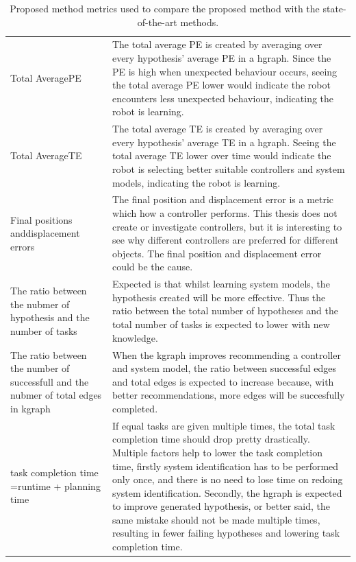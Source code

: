 \noindent
\begin{table}[H]
\centering
\begin{tabular}%
  {>{\raggedright\arraybackslash}p{}%
   >{\raggedright\arraybackslash}p{}}
Total Average\newline \acl{PE} & The total average \ac{PE} is created by averaging over every hypothesis' average \ac{PE} in a \ac{hgraph}. Since the \ac{PE} is high when unexpected behaviour occurs, seeing the total average \ac{PE} lower would indicate the robot encounters less unexpected behaviour, indicating the robot is learning.\\
Total Average\newline \acl{TE}& The total average \ac{TE} is created by averaging over every hypothesis' average \ac{TE} in a \ac{hgraph}. Seeing the total average \ac{TE} lower over time would indicate the robot is selecting better suitable controllers and system models, indicating the robot is learning.\\
Final positions and\newline displacement errors & The final position and displacement error is a metric which how a controller performs. This thesis does not create or investigate controllers, but it is interesting to see why different controllers are preferred for different objects. The final position and displacement error could be the cause.\\
The ratio between the nubmer of hypothesis and the number of tasks & Expected is that whilst learning system models, the hypothesis created will be more effective. Thus the ratio between the total number of hypotheses and the total number of tasks is expected to lower with new knowledge.\\
The ratio between the number of successfull and the nubmer of total edges in \ac{kgraph} & When the \ac{kgraph} improves recommending a controller and system model, the ratio between successful edges and total edges is expected to increase because, with better recommendations, more edges will be succesfully completed.\\
task completion time =\newline runtime + planning time& If equal tasks are given multiple times, the total task completion time should drop pretty drastically. Multiple factors help to lower the task completion time, firstly system identification has to be performed only once, and there is no need to lose time on redoing system identification. Secondly, the \ac{hgraph} is expected to improve generated hypothesis, or better said, the same mistake should not be made multiple times, resulting in fewer failing hypotheses and lowering task completion time.\\
\end{tabular}
\caption{Proposed method metrics used to compare the proposed method with the state-of-the-art methods.}\label{table:proposed_method_metrics}
\end{table}

